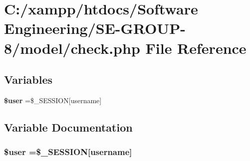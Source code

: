 \section{C\+:/xampp/htdocs/\+Software Engineering/\+S\+E-\/\+G\+R\+O\+U\+P-\/8/model/check.php File Reference}
\label{check_8php}
\subsection*{Variables}
\begin{DoxyCompactItemize}
\item 
{\bf \$user} =\$\+\_\+\+S\+E\+S\+S\+I\+O\+N[\textquotesingle{}username\textquotesingle{}]
\end{DoxyCompactItemize}


\subsection{Variable Documentation}
\subsubsection[{\$user}]{\setlength{\rightskip}{0pt plus 5cm}\${\bf user} =\$\+\_\+\+S\+E\+S\+S\+I\+O\+N[\textquotesingle{}username\textquotesingle{}]}\label{check_8php_a598ca4e71b15a1313ec95f0df1027ca5}

